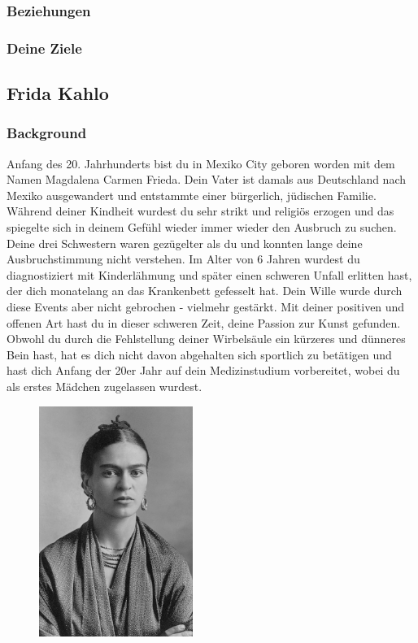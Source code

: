 \documentclass[12pt, a4paper, openany]{report}
\begin{document}
\subsubsection{Beziehungen}

\subsubsection{Deine Ziele}

\subsection{Frida Kahlo}
\subsubsection{Background}
Anfang des 20. Jahrhunderts bist du in Mexiko City geboren worden mit dem Namen Magdalena Carmen Frieda. Dein Vater ist damals aus Deutschland nach Mexiko ausgewandert und entstammte einer bürgerlich, jüdischen Familie. Während deiner Kindheit wurdest du sehr strikt und religiös erzogen und das spiegelte sich in deinem Gefühl wieder immer wieder den Ausbruch zu suchen. Deine drei Schwestern waren gezügelter als du und konnten lange deine Ausbruchstimmung nicht verstehen. Im Alter von 6 Jahren wurdest du diagnostiziert mit Kinderlähmung und später einen schweren Unfall erlitten hast, der dich monatelang an das Krankenbett gefesselt hat. Dein Wille wurde durch diese Events aber nicht gebrochen - vielmehr gestärkt. Mit deiner positiven und offenen Art hast du in dieser schweren Zeit, deine Passion zur Kunst gefunden. Obwohl du durch die Fehlstellung deiner Wirbelsäule ein kürzeres und dünneres Bein hast, hat es dich nicht davon abgehalten sich sportlich zu betätigen und hast dich Anfang der 20er Jahr auf dein Medizinstudium vorbereitet, wobei du als erstes Mädchen zugelassen wurdest.



\begin{figure}[h!]
\centering
\includegraphics[width=5cm]{frida_kahlo.jpg}
\end{figure}
\end{document}
